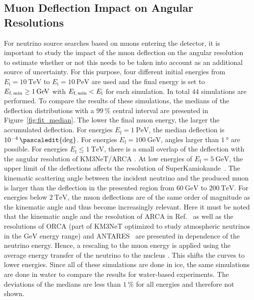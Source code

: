 \subsection{Muon Deflection Impact on Angular Resolutions}
For neutrino source searches based on muons entering the detector, 
it is important to study the impact of the muon 
deflection on the angular resolution to estimate whether or not this needs to be 
taken into account as an additional source of uncertainty.
For this purpose, four different initial energies 
from $E_{\text{i}} = \SI{10}{\tera\electronvolt}$ to 
$E_{\text{i}} = \SI{10}{\peta\electronvolt}$ are used and the final 
energy is set to $E_{\text{f,\,min}} \geq \SI{1}{\giga\electronvolt}$ with 
$E_{\text{f,\,min}} < E_{\text{i}}$ for each simulation. 
In total $\num{44}$ simulations are performed. 
To compare the results of these simulations, the medians of the deflection distributions 
with a $\SI{99}{\percent}$ central interval are presented in 
Figure~\ref{fig:fit_median}.
The lower the final muon energy, the larger the accumulated deflection. 
For energies $E_{\text{f}} = \SI{1}{\peta\electronvolt}$, the median deflection 
is $\num{e-4}\,\pascaledit{\text{deg}}$. For energies $E_{\text{f}} = \SI{100}{\giga\electronvolt}$, 
angles larger than $\SI{1}{\degree}$ are possible. 
For energies  
$E_{\text{f}} \leq \SI{1}{\tera\electronvolt}$, 
there is a small overlap of the deflection with the angular resolution of KM3NeT/ARCA 
\cite{KM3NeT_Resolution2021, KM3NeT_Resolution2016}. 
At low energies of $E_{\mathrm{f}} = \SI{5}{\giga\electronvolt}$, the upper limit of the 
deflections affects the resolution of SuperKamiokande~\cite{SuperKamiokande_Resolution2008}. 
The kinematic scattering angle between the incident neutrino and the produced muon is 
larger than the deflection in the presented region from $\SI{60}{\giga\electronvolt}$
to $\SI{200}{\tera\electronvolt}$. For energies below $\SI{2}{\tera\electronvolt}$,  
the muon deflections are of the same order of magnitude as the kinematic angle and thus become increasingly relevant.
Here it must be noted that the kinematic angle 
and the resolution of ARCA in Ref.~\cite{KM3NeT_Resolution2021} as well as 
the resolutions of ORCA (part of KM3NeT optimized to study atmospheric neutrinos in the $\si{\giga\electronvolt}$ energy range) \cite{ORCA_Resolution2021} and ANTARES~\cite{ANTARES_Resolution2019} are presented in dependence of the neutrino energy. 
Hence, a rescaling to the muon energy is applied using the average energy transfer of the neutrino to 
the nucleus \cite{GANDHI199681}. This shifts the curves to lower energies. 
Since all of these simulations are done 
in ice, the same simulations are done in water to compare the results for 
water-based experiments. The deviations of the medians
are less than $\SI{1}{\percent}$ for all energies and therefore not shown.


